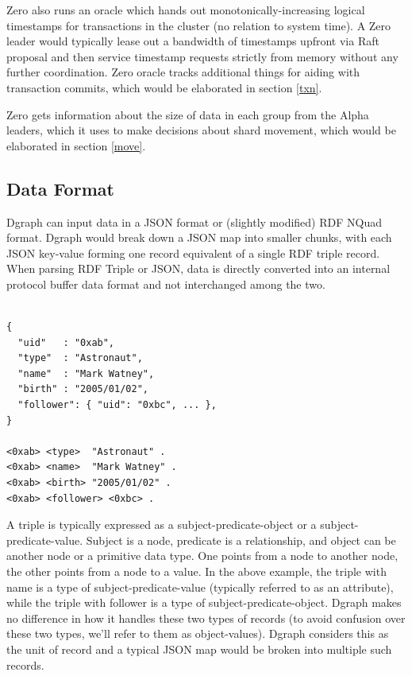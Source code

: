 \documentclass[letterpaper,twocolumn,10pt]{article}
\begin{document}
Zero also runs an oracle which hands out monotonically-increasing logical
timestamps for transactions in the cluster (no relation to system time). A Zero
leader would typically lease out a bandwidth of timestamps upfront via Raft
proposal and then service timestamp requests strictly from memory without any
further coordination. Zero oracle tracks additional things for aiding with
transaction commits, which would be elaborated in section \ref{txn}.

Zero gets information about the size of data in each group from the Alpha leaders,
which it uses to make decisions about shard movement, which would be elaborated
in section \ref{move}.


\subsection{Data Format}

Dgraph can input data in a JSON format or (slightly modified) RDF NQuad format.
Dgraph would break down a JSON map into smaller chunks, with each JSON key-value
forming one record equivalent of a single RDF triple record. When parsing RDF
Triple or JSON, data is directly converted into an internal protocol buffer
\cite{protobuf} data format and not interchanged among the two.

\begin{verbatim}

{
  "uid"   : "0xab",
  "type"  : "Astronaut",
  "name"  : "Mark Watney",
  "birth" : "2005/01/02",
  "follower": { "uid": "0xbc", ... },
}

<0xab> <type>  "Astronaut" .
<0xab> <name>  "Mark Watney" .
<0xab> <birth> "2005/01/02" .
<0xab> <follower> <0xbc> .

\end{verbatim}

A triple is typically expressed as a subject-predicate-object or a
subject-predicate-value. Subject is a node, predicate is a relationship, and
object can be another node or a primitive data type. One points from a node to
another node, the other points from a node to a value. In the above example, the
triple with name is a type of subject-predicate-value (typically referred to as
an attribute), while the triple with follower is a type of
subject-predicate-object. Dgraph makes no difference in how it handles these two
types of records (to avoid confusion over these two types, we'll refer to them
as object-values). Dgraph considers this as the unit of record and a typical
JSON map would be broken into multiple such records.
\end{document}
